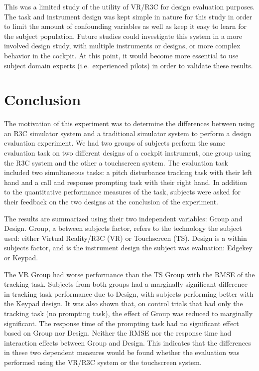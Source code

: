 This was a limited study of the utility of VR/R3C for design evaluation purposes.
The task and instrument design was kept simple in nature for this study in order to limit the amount of confounding variables as well as keep it easy to learn for the subject population.
Future studies could investigate this system in a more involved design study, with multiple instruments or designs, or more complex behavior in the cockpit.
At this point, it would become more essential to use subject domain experts (i.e.\ experienced pilots) in order to validate these results.

\section{Conclusion}

The motivation of this experiment was to determine the differences between using an R3C simulator system and a traditional simulator system to perform a design evaluation experiment.
We had two groups of subjects perform the same evaluation task on two different designs of a cockpit instrument, one group using the R3C system and the other a touchscreen system.
The evaluation task included two simultaneous tasks: a pitch disturbance tracking task with their left hand and a call and response prompting task with their right hand.
In addition to the quantitative performance measures of the task, subjects were asked for their feedback on the two designs at the conclusion of the experiment.

The results are summarized using their two independent variables: Group and Design.
Group, a between subjects factor, refers to the technology the subject used: either Virtual Reality/R3C (VR) or Touchscreen (TS).
Design is a within subjects factor, and is the instrument design the subject was evaluation: Edgekey or Keypad.

The VR Group had worse performance than the TS Group with the RMSE of the tracking task.
Subjects from both groups had a marginally significant difference in tracking task performance due to Design, with subjects performing better with the Keypad design.
It was also shown that, on control trials that had only the tracking task (no prompting task), the effect of Group was reduced to marginally significant.
The response time of the prompting task had no significant effect based on Group nor Design.
Neither the RMSE nor the response time had interaction effects between Group and Design.
This indicates that the differences in these two dependent measures would be found whether the evaluation was performed using the VR/R3C system or the touchscreen system.


